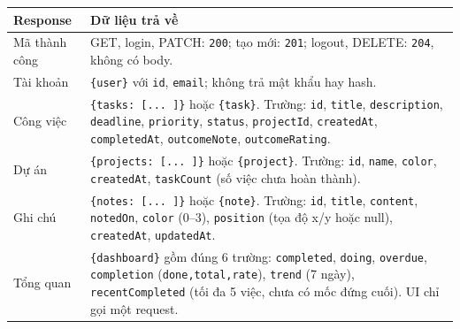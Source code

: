 \begin{longtable}{@{}P{.21\linewidth}P{.70\linewidth}@{}}
\toprule
\textbf{Response} & \textbf{Dữ liệu trả về} \\
\midrule
\endhead
Mã thành công & GET, login, PATCH: \texttt{200}; tạo mới: \texttt{201}; logout, DELETE: \texttt{204}, không có body. \\
Tài khoản & \texttt{\{user\}} với \texttt{id}, \texttt{email}; không trả mật khẩu hay hash. \\
Công việc & \texttt{\{tasks: [... ]\}} hoặc \texttt{\{task\}}. Trường: \texttt{id}, \texttt{title}, \texttt{description}, \texttt{deadline}, \texttt{priority}, \texttt{status}, \texttt{projectId}, \texttt{createdAt}, \texttt{completedAt}, \texttt{outcomeNote}, \texttt{outcomeRating}. \\
Dự án & \texttt{\{projects: [... ]\}} hoặc \texttt{\{project\}}. Trường: \texttt{id}, \texttt{name}, \texttt{color}, \texttt{createdAt}, \texttt{taskCount} (số việc chưa hoàn thành). \\
Ghi chú & \texttt{\{notes: [... ]\}} hoặc \texttt{\{note\}}. Trường: \texttt{id}, \texttt{title}, \texttt{content}, \texttt{notedOn}, \texttt{color} (0--3), \texttt{position} (tọa độ x/y hoặc null), \texttt{createdAt}, \texttt{updatedAt}. \\
Tổng quan & \texttt{\{dashboard\}} gồm đúng 6 trường: \texttt{completed}, \texttt{doing}, \texttt{overdue}, \texttt{completion} (\texttt{done,total,rate}), \texttt{trend} (7 ngày), \texttt{recentCompleted} (tối đa 5 việc, chưa có mốc đứng cuối). UI chỉ gọi một request. \\
\bottomrule
\end{longtable}

